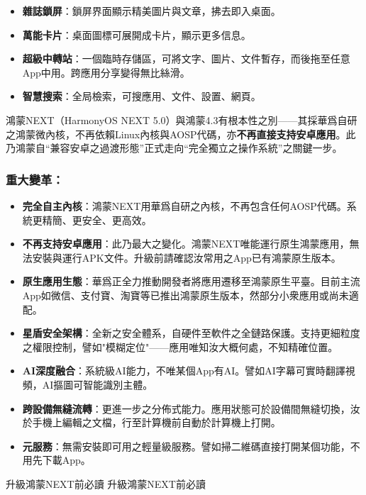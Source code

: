 \begin{itemize}
  \item \textbf{雜誌鎖屏}：鎖屏界面顯示精美圖片與文章，拂去即入桌面。
  \item \textbf{萬能卡片}：桌面圖標可展開成卡片，顯示更多信息。
  \item \textbf{超級中轉站}：一個臨時存儲區，可將文字、圖片、文件暫存，而後拖至任意App中用。跨應用分享變得無比絲滑。
  \item \textbf{智慧搜索}：全局檢索，可搜應用、文件、設置、網頁。
\end{itemize}


鴻蒙NEXT（HarmonyOS NEXT 5.0）與鴻蒙4.3有根本性之別——其採華爲自研之鴻蒙微內核，不再依賴Linux內核與AOSP代碼，亦\textbf{不再直接支持安卓應用}。此乃鴻蒙自“兼容安卓之過渡形態”正式走向“完全獨立之操作系統”之關鍵一步。

\subsubsection*{重大變革：}

\begin{itemize}
  \item \textbf{完全自主內核}：鴻蒙NEXT用華爲自研之內核，不再包含任何AOSP代碼。系統更精簡、更安全、更高效。
  \item \textbf{不再支持安卓應用}：此乃最大之變化。鴻蒙NEXT唯能運行原生鴻蒙應用，無法安裝與運行APK文件。升級前請確認汝常用之App已有鴻蒙原生版本。
  \item \textbf{原生應用生態}：華爲正全力推動開發者將應用遷移至鴻蒙原生平臺。目前主流App如微信、支付寶、淘寶等已推出鴻蒙原生版本，然部分小衆應用或尚未適配。
  \item \textbf{星盾安全架構}：全新之安全體系，自硬件至軟件之全鏈路保護。支持更細粒度之權限控制，譬如"模糊定位"——應用唯知汝大概何處，不知精確位置。
  \item \textbf{AI深度融合}：系統級AI能力，不唯某個App有AI。譬如AI字幕可實時翻譯視頻，AI摳圖可智能識別主體。
  \item \textbf{跨設備無縫流轉}：更進一步之分佈式能力。應用狀態可於設備間無縫切換，汝於手機上編輯之文檔，行至計算機前自動於計算機上打開。
  \item \textbf{元服務}：無需安裝即可用之輕量級服務。譬如掃二維碼直接打開某個功能，不用先下載App。
\end{itemize}

\begin{tcbwarn}{升級鴻蒙NEXT前必讀}
升級鴻蒙NEXT前必讀

\end{tcbwarn}

